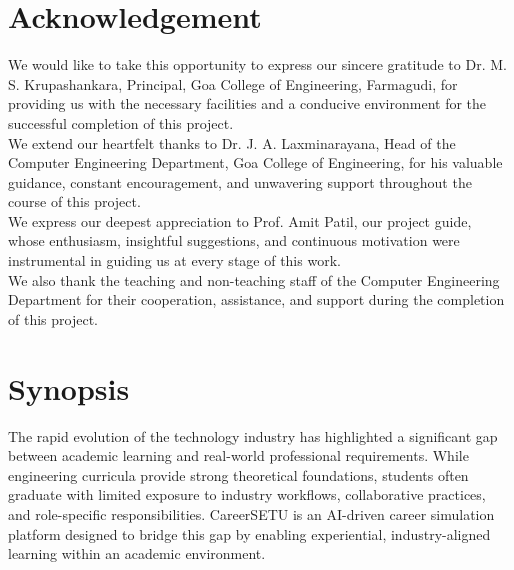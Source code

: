 \documentclass[12pt,a4paper]{report}
\begin{document}
\thispagestyle{empty}



\tableofcontents
\newpage


\chapter*{Acknowledgement}

We would like to take this opportunity to express our sincere gratitude to 
Dr. M. S. Krupashankara, Principal, Goa College of Engineering, Farmagudi, 
for providing us with the necessary facilities and a conducive environment 
for the successful completion of this project.\\[0.1cm]

We extend our heartfelt thanks to Dr. J. A. Laxminarayana, Head of the 
Computer Engineering Department, Goa College of Engineering, for his 
valuable guidance, constant encouragement, and unwavering support 
throughout the course of this project.\\[0.1cm]

We express our deepest appreciation to Prof. Amit Patil, our project guide, 
whose enthusiasm, insightful suggestions, and continuous motivation were 
instrumental in guiding us at every stage of this work.\\[0.1cm]

We also thank the teaching and non-teaching staff of the Computer Engineering 
Department for their cooperation, assistance, and support during the 
completion of this project.

\chapter*{Synopsis}

The rapid evolution of the technology industry has highlighted a significant gap between
academic learning and real-world professional requirements. While engineering curricula
provide strong theoretical foundations, students often graduate with limited exposure to
industry workflows, collaborative practices, and role-specific responsibilities. CareerSETU
is an AI-driven career simulation platform designed to bridge this gap by enabling
experiential, industry-aligned learning within an academic environment.\\[0.1cm]
\end{document}
